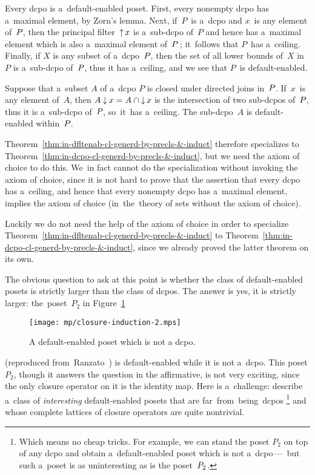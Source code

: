 \documentclass[11pt,letterpaper]{article}
\renewcommand{\emph}[1]{\textit{#1\/}}
\renewcommand{\thmskip}{\bigskip}
\begin{document}
\thmskip

Every dcpo is a~default-enabled poset.
First, every nonempty dcpo has a~maximal element, by Zorn's lemma.
Next, if~$P$~is a~dcpo and $x$~is any element of~$P\mspace{-1mu}$,
then the principal filter~$\mathop{\smash{\uparrow}}\nolimits x$ is a~sub-dcpo of~$P$
and hence has a~maximal element which is also a~maximal element of~$P\mspace{2mu}$;
it~follows that $P$~has a~ceiling.
Finally, if $X$ is any subset of a~dcpo~$P\mspace{-1mu}$,
then the set of all lower bounds of~$X$ in~$P$ is a~sub-dcpo of~$P\mspace{-1mu}$,
thus it has a~ceiling,
and we see that $P$~is default-enabled.

Suppose that a~subset $A$ of a~dcpo $P$ is closed under directed joins in~$P\mspace{-1mu}$.
If~$x$~is any element of~$A$,
then $A\mathbin{\downarrow} x = A \cap \mathop{\smash{\downarrow}}\nolimits x$
	is the intersection of two sub-dcpos of~$P\mspace{-1mu}$,
thus it is a~sub-dcpo of~$P\mspace{-1mu}$,
so~it~has a~ceiling.
The sub-dcpo~$A$ is default-enabled within~$P\mspace{-1mu}$.

Theorem~\ref{thm:in-dfltenab-cl-generd-by-precls-&-induct}
therefore specializes to Theorem~\ref{thm:in-dcpo-cl-generd-by-precls-&-induct},
but we need the axiom of choice to do this.
We~in fact cannot do the specialization without invoking the axiom of choice,
since it is not hard to prove that the assertion
	that every dcpo has a~ceiling,
	and hence that every nonempty dcpo has a~maximal element,
implies the axiom of choice
	(in~the~theory of sets without the axiom of choice).

Luckily we do not need the help of the axiom of choice
	in order to specialize Theorem~\ref{thm:in-dfltenab-cl-generd-by-precls-&-induct}
		to Theorem~\ref{thm:in-dcpo-cl-generd-by-precls-&-induct},
since we already proved the latter theorem on its own.

\txtskip

The obvious question to ask at this point is
whether the class of default-enabled posets is strictly larger than the class of dcpos.
The answer is yes, it is strictly larger: the~poset~$P_2$ in Figure~\ref{fig:dfltenabd-post-not-dcpo}
%
\begin{figure}[!htp]\centering
\vspace{1ex}
\texttt{[image: mp/closure-induction-2.mps]}
\vspace{.5ex}
\caption{A default-enabled poset which is not a dcpo.}
\label{fig:dfltenabd-post-not-dcpo}
\end{figure}
%
	(reproduced from~Ranzato~\cite{ranzato})
is default-enabled while it is not a~dcpo.
This poset $P_2$, though it answers the question in the affirmative,
is not very exciting, since the only closure operator on it is the identity map.
Here is a~challenge: describe a~class of \emph{interesting} default-enabled posets
that are far~from~being~dcpos%
%
\footnote{Which means no cheap tricks.
For example, we can stand the poset $P_2$ on top of any dcpo
and obtain a~default-enabled poset which is not a~dcpo\,---\,%
but such a~poset is as uninteresting as is the poset~$P_2\mspace{1mu}$.}
%
and whose complete lattices of closure operators are quite nontrivial.
\end{document}
